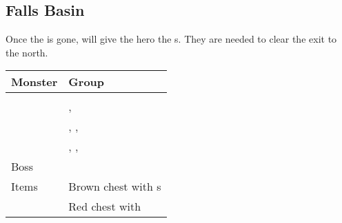 \subsection{Falls Basin}
\label{map:falls_basin}

Once the  is gone,  will give the hero the s. They are needed to clear the exit to the north.

\noindent\begin{tabularx}{\textwidth}[l]{lX}
	Monster & Group
\\ \hline
	\nameref{monster:desert_hag}
	& \nameref{monster:desert_hag} \\
	& \nameref{monster:desert_hag}, \nameref{monster:desert_hag}
\\ \hline
	\nameref{monster:lamia}
	& \nameref{monster:lamia}, \nameref{monster:lamia}, \\
	& \nameref{monster:lamia}, \nameref{monster:lamia}, \nameref{monster:desert_hag}
\\ \hline
	Boss & \nameref{monster:snow_crab}
\\ \hline
	Items
	& Brown chest with \nameref{weapon:bomb}s \\
	& Red chest with \nameref{spell:heal}
\end{tabularx}
